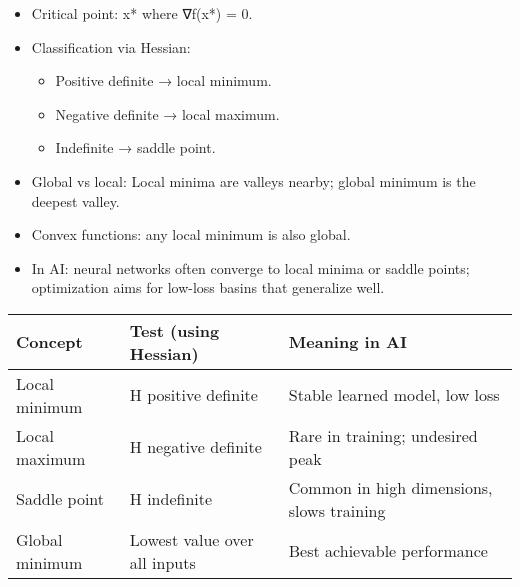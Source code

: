 \documentclass[
  letterpaper,
  DIV=11,
  numbers=noendperiod]{scrreprt}
\providecommand{\tightlist}{%
  \setlength{\itemsep}{0pt}\setlength{\parskip}{0pt}}
\begin{document}
\begin{itemize}
\item
  Critical point: x* where ∇f(x*) = 0.
\item
  Classification via Hessian:

  \begin{itemize}
  \tightlist
  \item
    Positive definite → local minimum.
  \item
    Negative definite → local maximum.
  \item
    Indefinite → saddle point.
  \end{itemize}
\item
  Global vs local: Local minima are valleys nearby; global minimum is
  the deepest valley.
\item
  Convex functions: any local minimum is also global.
\item
  In AI: neural networks often converge to local minima or saddle
  points; optimization aims for low-loss basins that generalize well.
\end{itemize}

\begin{longtable}[]{@{}
  >{\raggedright\arraybackslash}p{}
  >{\raggedright\arraybackslash}p{}
  >{\raggedright\arraybackslash}p{}@{}}
\toprule\noalign{}
\begin{minipage}[b]{\linewidth}\raggedright
Concept
\end{minipage} & \begin{minipage}[b]{\linewidth}\raggedright
Test (using Hessian)
\end{minipage} & \begin{minipage}[b]{\linewidth}\raggedright
Meaning in AI
\end{minipage} \\
\midrule\noalign{}
\endhead
\bottomrule\noalign{}
\endlastfoot
Local minimum & H positive definite & Stable learned model, low loss \\
Local maximum & H negative definite & Rare in training; undesired
peak \\
Saddle point & H indefinite & Common in high dimensions, slows
training \\
Global minimum & Lowest value over all inputs & Best achievable
performance \\
\end{longtable}
\end{document}

